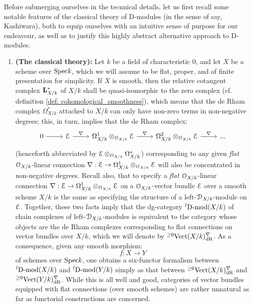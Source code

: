         Before submerging ourselves in the tecnnical details, let us first recall some notable features of the classical theory of D-modules (in the sense of say, Kashiwara), both to equip ourselves with an intuitive sense of purpose for our endeavour, as well as to justify this highly abstract alternative approach to D-modules. 
            \begin{enumerate}
                \item \textbf{(The classical theory):} Let $k$ be a field of characteristic $0$, and let $X$ be a scheme over $\mathrm{Spec} k$, which we will assume to be flat, proper, and of finite presentation for simplicity. If $X$ is smooth, then the relative cotangent complex $\mathbf{L}^*_{X/k}$ of $X/k$ shall be quasi-isomorphic to the zero complex (cf. definition \ref{def: cohomological_smoothness}), which means that the de Rham complex $\Omega^*_{X/k}$ attached to $X/k$ can only have non-zero terms in non-negative degrees; this, in turn, implies that the de Rham complex:
                    $$
                        \begin{tikzcd}
                        	0 & \E & {\Omega^1_{X/k} \tensor_{\calO_{X/k}} \E} & {\Omega^2_{X/k} \tensor_{\calO_{X/k}} \E} & {...}
                        	\arrow["\nabla", from=1-4, to=1-5]
                        	\arrow["\nabla", from=1-3, to=1-4]
                        	\arrow["\nabla", from=1-2, to=1-3]
                        	\arrow[from=1-1, to=1-2]
                        \end{tikzcd}
                    $$
                (henceforth abbreviated by $\E \tensor_{\calO_{X/k}} \Omega^*_{X/k}$) corresponding to any given \textit{flat} $\mathcal{O}_{X/k}$-linear connection $\nabla: \E \to \Omega^1_{X/k} \tensor_{\calO_{X/k}} \E$ will also be concentrated in non-negative degrees. Recall also, that to specify a \textit{flat} $\mathcal{O}_{X/k}$-linear connection $\nabla: \E \to \Omega^1_{X/k} \tensor_{\calO_{X/k}} \E$ on a $\mathcal{O}_{X/k}$-vector bundle $\mathcal{E}$ over a smooth scheme $X/k$ is the same as specifying the structure of a left-$\mathcal{D}_{X/k}$-module on $\mathcal{E}$. Together, these two facts imply that the dg-category ${}^l\mathrm{D}\text{-}\mathrm{mod}(X/k)$ of chain complexes of left-$\mathcal{D}_{X/k}$-modules is equivalent to the category whose objects are the de Rham complexes corresponding to flat connections on vector bundles over $X/k$, which we will denote by ${}^{\geq 0}\mathrm{Vect}(X/k)^{\nabla}_{\mathrm{dR}}$. As a consequence, given any smooth morphism:
                    $$f: X \to Y$$
                of schemes over $\mathrm{Spec} k$, one obtains a six-functor formalism between ${}^l\mathrm{D}\text{-}\mathrm{mod}(X/k)$ and ${}^l\mathrm{D}\text{-}\mathrm{mod}(Y/k)$ simply as that between ${}^{\geq 0}\mathrm{Vect}(X/k)^{\nabla}_{\mathrm{dR}}$ and ${}^{\geq 0}\mathrm{Vect}(Y/k)^{\nabla}_{\mathrm{dR}}$. While this is all well and good, categories of vector bundles equipped with flat connections (over smooth schemes) are rather unnatural as far as functorial constructions are concerned. 
                

\end{enumerate}
